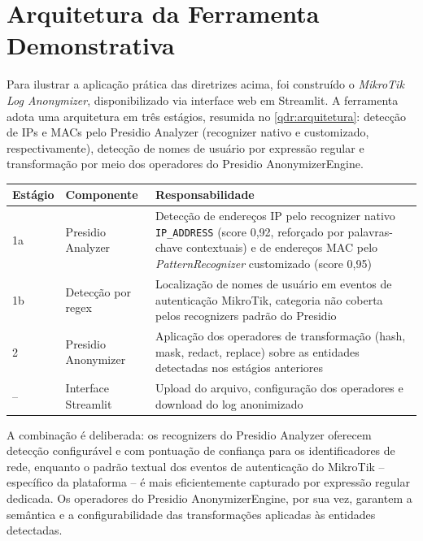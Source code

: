 \section{Arquitetura da Ferramenta Demonstrativa}
\label{sec:arquitetura}

Para ilustrar a aplicação prática das diretrizes acima, foi construído o \textit{MikroTik Log Anonymizer}, disponibilizado via interface web em Streamlit. A ferramenta adota uma arquitetura em três estágios, resumida no \autoref{qdr:arquitetura}: detecção de IPs e MACs pelo Presidio Analyzer (recognizer nativo e customizado, respectivamente), detecção de nomes de usuário por expressão regular e transformação por meio dos operadores do Presidio AnonymizerEngine.

\begin{quadro}[htb]
    \caption{\label{qdr:arquitetura}Pipeline de processamento do MikroTik Log Anonymizer}
    \begin{tabular}{|p{1.5cm}|p{3.5cm}|p{8.8cm}|}
        \hline
        \textbf{Estágio} & \textbf{Componente} & \textbf{Responsabilidade} \\
        \hline
        1a & Presidio Analyzer & Detecção de endereços IP pelo recognizer nativo \texttt{IP\_ADDRESS} (score 0,92, reforçado por palavras-chave contextuais) e de endereços MAC pelo \textit{PatternRecognizer} customizado (score 0,95) \\
        \hline
        1b & Detecção por regex & Localização de nomes de usuário em eventos de autenticação MikroTik, categoria não coberta pelos recognizers padrão do Presidio \\
        \hline
        2 & Presidio Anonymizer & Aplicação dos operadores de transformação (hash, mask, redact, replace) sobre as entidades detectadas nos estágios anteriores \\
        \hline
        -- & Interface Streamlit & Upload do arquivo, configuração dos operadores e download do log anonimizado \\
        \hline
    \end{tabular}
\end{quadro}

A combinação é deliberada: os recognizers do Presidio Analyzer oferecem detecção configurável e com pontuação de confiança para os identificadores de rede, enquanto o padrão textual dos eventos de autenticação do MikroTik -- específico da plataforma -- é mais eficientemente capturado por expressão regular dedicada. Os operadores do Presidio AnonymizerEngine, por sua vez, garantem a semântica e a configurabilidade das transformações aplicadas às entidades detectadas.

